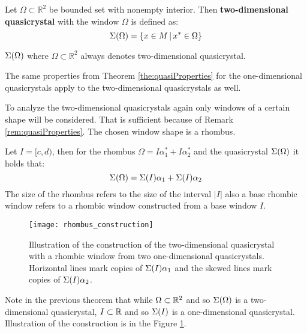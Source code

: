 \documentclass[text.tex]{subfiles}
\begin{document}
\begin{definition}
Let $\Omega \subset \mathbb{R}^2$ be bounded set with nonempty interior. Then \textbf{two-dimensional quasicrystal} with the window $\Omega$ is defined as:
$$\Sigma(\Omega) = \left\{ x \in M\,|\,x^\ast \in \Omega \right\}$$
\end{definition}

\begin{remark}
$\Sigma(\Omega)$ where $\Omega \subset \mathbb{R}^2$ always denotes two-dimensional quasicrystal.
\end{remark}

\begin{remark}
\label{rem:quasiProperties}
The same properties from Theorem \ref{the:quasiProperties} for the one-dimensional quasicrystals apply to the two-dimensional quasicrystals as well.
\end{remark}

To analyze the two-dimensional quasicrystals again only windows of a certain shape will be considered. That is sufficient because of Remark \ref{rem:quasiProperties}. The chosen window shape is a rhombus. 

\begin{theorem}
\label{the:twoToOne}
Let $I = [c,d)$, then for the rhombus $\Omega = I\alpha_1^\ast + I\alpha_2^\ast$ and the quasicrystal $\Sigma(\Omega)$ it holds that: 
$$\Sigma(\Omega) = \Sigma(I)\alpha_1 + \Sigma(I)\alpha_2$$
The size of the rhombus refers to the size of the interval $|I|$ also a base rhombic window refers to a rhombic window constructed from a base window $I$.
\end{theorem}

\begin{figure}[h]
\centering
\texttt{[image: rhombus\_construction]}
\caption{Illustration of the construction of the two-dimensional quasicrystal with a rhombic window from two one-dimensional quasicrystals. Horizontal lines mark copies of $\Sigma(I)\alpha_1$ and the skewed lines mark copies of $\Sigma(I)\alpha_2$.}
\label{fig:quasiRhombusConstruction}
\end{figure}

\begin{remark}
Note in the previous theorem that while $\Omega \subset \mathbb{R}^2$ and so $\Sigma(\Omega)$ is a two-dimensional quasicrystal, $I \subset \mathbb{R}$ and so $\Sigma(I)$ is a one-dimensional quasicrystal. Illustration of the construction is in the Figure \ref{fig:quasiRhombusConstruction}.
\end{remark}
\end{document}
